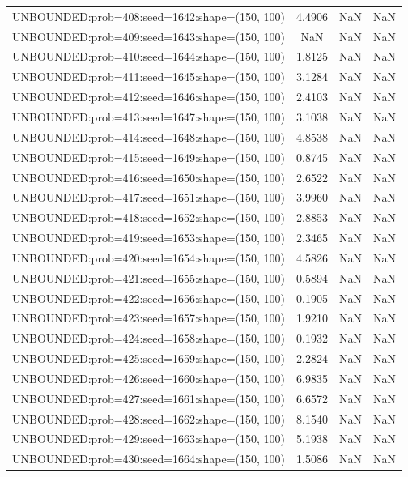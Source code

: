\begin{longtable}{lccc}
UNBOUNDED:prob=408:seed=1642:shape=(150, 100) &  4.4906 &   NaN &    NaN \\
UNBOUNDED:prob=409:seed=1643:shape=(150, 100) &     NaN &   NaN &    NaN \\
UNBOUNDED:prob=410:seed=1644:shape=(150, 100) &  1.8125 &   NaN &    NaN \\
UNBOUNDED:prob=411:seed=1645:shape=(150, 100) &  3.1284 &   NaN &    NaN \\
UNBOUNDED:prob=412:seed=1646:shape=(150, 100) &  2.4103 &   NaN &    NaN \\
UNBOUNDED:prob=413:seed=1647:shape=(150, 100) &  3.1038 &   NaN &    NaN \\
UNBOUNDED:prob=414:seed=1648:shape=(150, 100) &  4.8538 &   NaN &    NaN \\
UNBOUNDED:prob=415:seed=1649:shape=(150, 100) &  0.8745 &   NaN &    NaN \\
UNBOUNDED:prob=416:seed=1650:shape=(150, 100) &  2.6522 &   NaN &    NaN \\
UNBOUNDED:prob=417:seed=1651:shape=(150, 100) &  3.9960 &   NaN &    NaN \\
UNBOUNDED:prob=418:seed=1652:shape=(150, 100) &  2.8853 &   NaN &    NaN \\
UNBOUNDED:prob=419:seed=1653:shape=(150, 100) &  2.3465 &   NaN &    NaN \\
UNBOUNDED:prob=420:seed=1654:shape=(150, 100) &  4.5826 &   NaN &    NaN \\
UNBOUNDED:prob=421:seed=1655:shape=(150, 100) &  0.5894 &   NaN &    NaN \\
UNBOUNDED:prob=422:seed=1656:shape=(150, 100) &  0.1905 &   NaN &    NaN \\
UNBOUNDED:prob=423:seed=1657:shape=(150, 100) &  1.9210 &   NaN &    NaN \\
UNBOUNDED:prob=424:seed=1658:shape=(150, 100) &  0.1932 &   NaN &    NaN \\
UNBOUNDED:prob=425:seed=1659:shape=(150, 100) &  2.2824 &   NaN &    NaN \\
UNBOUNDED:prob=426:seed=1660:shape=(150, 100) &  6.9835 &   NaN &    NaN \\
UNBOUNDED:prob=427:seed=1661:shape=(150, 100) &  6.6572 &   NaN &    NaN \\
UNBOUNDED:prob=428:seed=1662:shape=(150, 100) &  8.1540 &   NaN &    NaN \\
UNBOUNDED:prob=429:seed=1663:shape=(150, 100) &  5.1938 &   NaN &    NaN \\
UNBOUNDED:prob=430:seed=1664:shape=(150, 100) &  1.5086 &   NaN &    NaN \\

\end{longtable}

